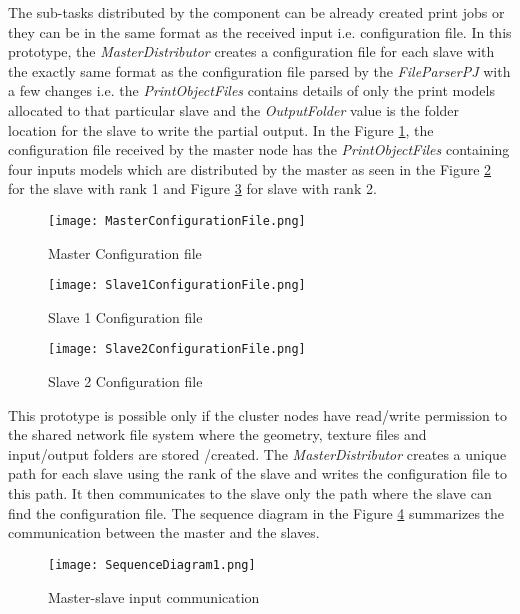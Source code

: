 The sub-tasks distributed by the component can be already created print jobs or they can be in the same format as the received input i.e. configuration file. In this prototype, the \textit{MasterDistributor} creates a configuration file for each slave with the exactly same format as the configuration file parsed by the \textit{FileParserPJ} with a few changes i.e. the \textit{PrintObjectFiles} contains details of only the print models allocated to that particular slave and the \textit{OutputFolder} value is the folder location for the slave to write the partial output. In the Figure \ref{fig:MasterConfigurationFile}, the configuration file received by the master node has the \textit{PrintObjectFiles} containing four inputs models which are distributed by the master as seen in the Figure \ref{fig:Slave1ConfigurationFile} for the slave with rank 1 and Figure \ref{fig:Slave2ConfigurationFile} for slave with rank 2. 

\begin{figure}[ht!]
\centering
\texttt{[image: MasterConfigurationFile.png]}
\caption{Master Configuration file}
\label{fig:MasterConfigurationFile}
\end{figure}

\begin{figure}[ht!]
\centering
\texttt{[image: Slave1ConfigurationFile.png]}
\caption{Slave 1 Configuration file}
\label{fig:Slave1ConfigurationFile}
\end{figure}

\begin{figure}[ht!]
\centering
\texttt{[image: Slave2ConfigurationFile.png]}
\caption{Slave 2 Configuration file}
\label{fig:Slave2ConfigurationFile}
\end{figure}

This prototype is possible only if the cluster nodes have read/write permission to the shared network file system where the geometry, texture files and input/output folders are stored /created. The \textit{MasterDistributor} creates a unique path for each slave using the rank of the slave and writes the configuration file to this path. It then communicates to the slave only the path where the slave can find the configuration file. The sequence diagram in the Figure \ref{fig:SequenceDiagram1} summarizes the communication between the master and the slaves.  

\begin{figure}[ht!]
\centering
\texttt{[image: SequenceDiagram1.png]}
\caption{Master-slave input communication}
\label{fig:SequenceDiagram1}
\end{figure}

